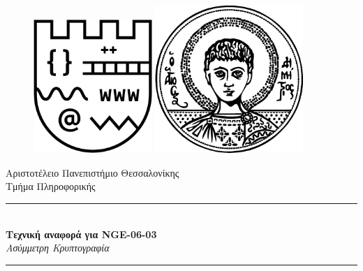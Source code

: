 \documentclass[oneside]{article}
\newcommand{\Rule}{\rule{\linewidth}{0.5mm}}
\begin{document}
    
\begin{titlepage}

    \begin{figure}[!htb]
        \centering
        \begin{minipage}{0.45\textwidth}
            \centering
            \includegraphics[width=0.4\textwidth]{Images/logo_csd.png} %
        \end{minipage}\hfill
        \begin{minipage}{0.45\textwidth}
            \centering
            \includegraphics[width=0.5\textwidth]{Images/logo_auth.png} %
        \end{minipage}
    \end{figure}
     
    \begin{center}
        \LARGE{Αριστοτέλειο Πανεπιστήμιο Θεσσαλονίκης}
        \vspace{5mm}
        \\ \Large{Τμήμα Πληροφορικής}
    \end{center}
    
    \vspace*{\fill}
    
    \begin{center}
        \Rule \\[0.4cm]
        { \LARGE 
            \textbf{Τεχνική αναφορά για NGE-06-03}\\[0.4cm]
            \emph{Ασύμμετρη Κρυπτογραφία}\\[0.4cm]
        }
        \Rule \\[0.4cm]
    \end{center}
    

\end{titlepage}
\end{document}

